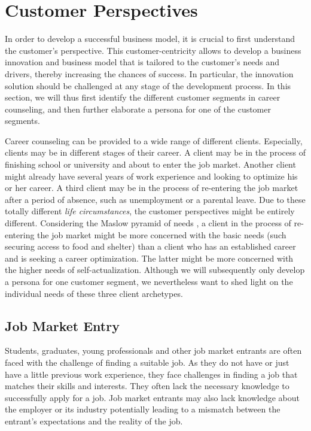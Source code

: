 \section{Customer Perspectives}
\label{sec:customer_perspective}

In order to develop a successful business model, it is crucial to first understand the customer's
perspective. This customer-centricity allows to develop a business innovation and business model
that is tailored to the customer's needs and drivers, thereby increasing the chances of success.
In particular, the innovation solution should be challenged at any stage of the development process.
In this section, we will thus first identify the different customer segments in career counseling,
and then further elaborate a persona for one of the customer segments.

Career counseling can be provided to a wide range of different clients. Especially, clients may be
in different stages of their career. A client may be in the process of finishing school or university
and about to enter the job market. Another client might already have several years of work experience
and looking to optimize his or her career. A third client may be in the process of re-entering the job
market after a period of absence, such as unemployment or a parental leave. Due to these totally different
\textit{life circumstances}, the customer perspectives might be entirely different. Considering the
Maslow pyramid of needs \citep{maslowTheoryHumanMotivation1943}, a client in the process of re-entering
the job market might be more concerned with the basic needs (such securing access to food and shelter)
than a client who has an established career and is seeking a career optimization. The latter might be
more concerned with the higher needs of self-actualization. Although we will subsequently only develop
a persona for one customer segment, we nevertheless want to shed light on the individual needs of these
three client archetypes.

\subsection{Job Market Entry}

Students, graduates, young professionals and other job market entrants are often faced with the
challenge of finding a suitable job. As they do not have or just have a little previous work experience,
they face challenges in finding a job that matches their skills and interests. They often lack the necessary
knowledge to successfully apply for a job. Job market entrants may also lack knowledge about the employer
or its industry potentially leading to a mismatch between the entrant's expectations and the reality of the
job.

